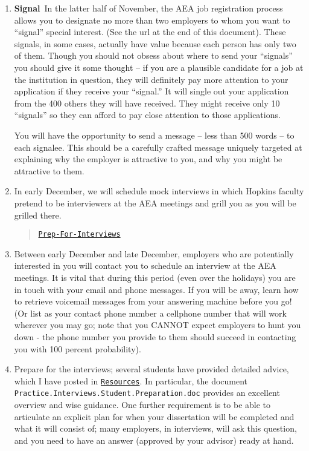 \documentclass{\classes/econtex}
\begin{document}
\begin{enumerate}
\item \ifdvi\hypertarget{Signal}{\textbf{Signal}~}\fi In the latter half of November, the AEA job registration process 
  allows you to designate no more than two employers to whom you want
  to ``signal'' special interest.  (See the url at the end of this
  document).  These signals, in some cases, actually have value because 
  each person has only two of them.  Though you should not obsess about 
  where to send your ``signals'' you should give it some thought -- if you
  are a plausible candidate for a job at the institution in question, they
  will definitely pay more attention to your application if they receive your 
  ``signal.''  It will single out your application from the 400 others they will have received.
  They might receive only 10 ``signals'' so they can afford to pay close attention
  to those applications.

  You will have the opportunity to send a message -- less than 500 words -- to each signalee.  This should be a carefully crafted message uniquely targeted at explaining why the employer is attractive to you, and why you might be attractive to them.

  
  \hypertarget{Mock-Interviews}{}
\item In early December, we will schedule mock interviews in which
  Hopkins faculty pretend to be interviewers at the AEA meetings and
  grill you as you will be grilled there.

  \begin{quote}
    \href{\pageurl/Steps#Prep-For-Interviews}{\texttt{Prep-For-Interviews}}
  \end{quote}
  
  \hypertarget{Be-Reachable}{}
\item Between early December and late December, employers who are
  potentially interested in you will contact you to schedule an
  interview at the AEA meetings.  It is vital that during this period
  (even over the holidays) you are in touch with your email and phone
  messages.  If you will be away, learn how to retrieve voicemail
  messages from your answering machine before you go!  (Or list as
  your contact phone number a cellphone number that will work wherever
  you may go; note that you CANNOT expect employers to hunt you down -
  the phone number you provide to them should succeed in contacting
  you with 100 percent probability).
  
  \hypertarget{Prep-For-Interviews}{} %
\item Prepare for the interviews; several students have provided
  detailed advice, which I have posted in \href{\treeurl/Resources}{\texttt{Resources}}.  In particular, the document
  \texttt{Practice.Interviews.Student.Preparation.doc} provides an
  excellent overview and wise guidance. One further requirement is to be
  able to articulate an explicit plan for when your dissertation will
  be completed and what it will consist of; many employers, in
  interviews, will ask this question, and you need to have an answer
  (approved by your advisor) ready at hand.


\end{enumerate}
\end{document}
